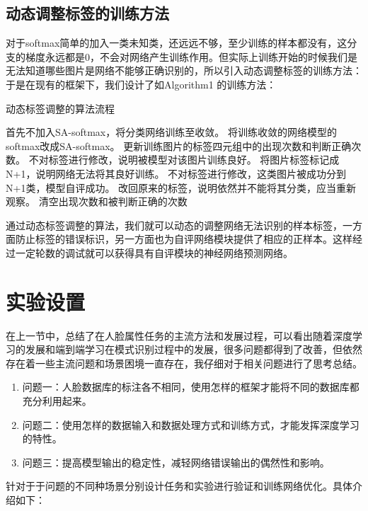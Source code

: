\subsection{动态调整标签的训练方法}
对于softmax简单的加入一类未知类，还远远不够，至少训练的样本都没有，这分支的梯度永远都是0，不会对网络产生训练作用。但实际上训练开始的时候我们是无法知道哪些图片是网络不能够正确识别的，所以引入动态调整标签的训练方法：
于是在现有的框架下，我们设计了如Algorithm1 的训练方法：
\begin{algorithm}[h]
\caption{动态标签调整的算法流程}
\begin{algorithmic}[1]
\STATE 首先不加入SA-softmax，将分类网络训练至收敛。
\STATE 将训练收敛的网络模型的softmax改成SA-softmax。
\STATE 更新训练图片的标签四元组中的出现次数和判断正确次数。
\ENDFOR
{}
\STATE 不对标签进行修改，说明被模型对该图片训练良好。
\ELSE[准确率低于0.5]
\STATE 将图片标签标记成N+1，说明网络无法将其良好训练。
\ENDIF
\ELSE 
{}
\STATE 不对标签进行修改，这类图片被成功分到N+1类，模型自评成功。
\ELSE [准确率低于0.5]
\STATE 改回原来的标签，说明依然并不能将其分类，应当重新观察。
\ENDIF
\ENDIF
\STATE 清空出现次数和被判断正确的次数
\ENDWHILE
\end{algorithmic}
\end{algorithm}

通过动态标签调整的算法，我们就可以动态的调整网络无法识别的样本标签，一方面防止标签的错误标识，另一方面也为自评网络模块提供了相应的正样本。这样经过一定轮数的调试就可以获得具有自评模块的神经网络预测网络。
\section{实验设置}
在上一节中，总结了在人脸属性任务的主流方法和发展过程，可以看出随着深度学习的发展和端到端学习在模式识别过程中的发展，很多问题都得到了改善，但依然存在着一些主流问题和场景困境一直存在，我仔细对于相关问题进行了思考总结。
\begin{enumerate}
\item 问题一：人脸数据库的标注各不相同，使用怎样的框架才能将不同的数据库都充分利用起来。
\item 问题二：使用怎样的数据输入和数据处理方式和训练方式，才能发挥深度学习的特性。
\item 问题三：提高模型输出的稳定性，减轻网络错误输出的偶然性和影响。
\end{enumerate}
针对于于问题的不同种场景分别设计任务和实验进行验证和训练网络优化。具体介绍如下：
